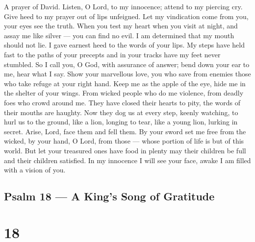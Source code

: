 A prayer of David.  Listen, O Lord, to my innocence; attend
to my piercing cry. Give heed to my prayer out of lips unfeigned.
 Let my vindication come from you, your eyes see the truth.
 When you test my heart when you visit at night, and assay
me like silver --- you can find no evil. I am determined that my mouth
should not lie.  I gave earnest heed to the words of your
lips.  My steps have held fast to the paths of your precepts
and in your tracks have my feet never stumbled.  So I call
you, O God, with assurance of answer; bend down your ear to me, hear
what I say.  Show your marvellous love, you who save from
enemies those who take refuge at your right hand.  Keep me
as the apple of the eye, hide me in the shelter of your wings.
 From wicked people who do me violence, from deadly foes who
crowd around me.  They have closed their hearts to pity,
the words of their mouths are haughty.  Now they dog us at
every step, keenly watching, to hurl us to the ground, 
like a lion, longing to tear, like a young lion, lurking in secret.
 Arise, Lord, face them and fell them. By your sword set me
free from the wicked,  by your hand, O Lord, from those ---
whose portion of life is but of this world. But let your treasured ones
have food in plenty may their children be full and their children
satisfied.  In my innocence I will see your face, awake I
am filled with a vision of you.

\hypertarget{psalm-18-a-kings-song-of-gratitude}{%
\subsection{Psalm 18 --- A King's Song of
Gratitude}\label{psalm-18-a-kings-song-of-gratitude}}

\hypertarget{section-17}{%
\section{18}\label{section-17}}

